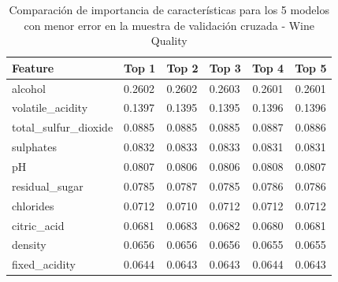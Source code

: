 \begin{table}[ht!]
\centering
\caption{Comparación de importancia de características para los 5 modelos con menor error en la muestra de validación cruzada - Wine Quality}
\label{tbl:imp_wine_quality}
\begin{tabular}{llllcc}
\hline
Feature & Top 1 & Top 2 & Top 3 & Top 4 & Top 5 \\
\hline
alcohol & 0.2602 & 0.2602 & 0.2603 & 0.2601 & 0.2601 \\
volatile\_acidity & 0.1397 & 0.1395 & 0.1395 & 0.1396 & 0.1396 \\
total\_sulfur\_dioxide & 0.0885 & 0.0885 & 0.0885 & 0.0887 & 0.0886 \\
sulphates & 0.0832 & 0.0833 & 0.0833 & 0.0831 & 0.0831 \\
pH & 0.0807 & 0.0806 & 0.0806 & 0.0808 & 0.0807 \\
residual\_sugar & 0.0785 & 0.0787 & 0.0785 & 0.0786 & 0.0786 \\
chlorides & 0.0712 & 0.0710 & 0.0712 & 0.0712 & 0.0712 \\
citric\_acid & 0.0681 & 0.0683 & 0.0682 & 0.0680 & 0.0681 \\
density & 0.0656 & 0.0656 & 0.0656 & 0.0655 & 0.0655 \\
fixed\_acidity & 0.0644 & 0.0643 & 0.0643 & 0.0644 & 0.0643 \\
\hline
\end{tabular}
\end{table}
